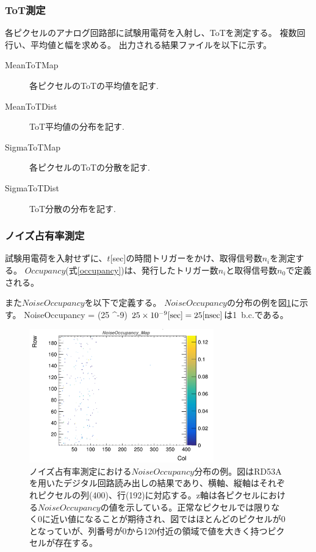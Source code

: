 \subsubsection{ToT測定}
各ピクセルのアナログ回路部に試験用電荷を入射し、ToTを測定する。
複数回行い、平均値と幅を求める。
出力される結果ファイルを以下に示す。
\begin{description}
  \item [MeanToTMap] 各ピクセルのToTの平均値を記す.
  \item [MeanToTDist] ToT平均値の分布を記す. 
  \item [SigmaToTMap] 各ピクセルのToTの分散を記す.
  \item [SigmaToTDist] ToT分散の分布を記す.
\end{description}

\subsubsection{ノイズ占有率測定}
試験用電荷を入射せずに、$t$[sec]の時間トリガーをかけ、取得信号数$n_i$を測定する。
$Occupancy$(式\ref{occupancy})は、発行したトリガー数$n_i$と取得信号数$n_0$で定義される。

また$NoiseOccupancy$を以下で定義する。
$NoiseOccupancy$の分布の例を図\ref{noise_occ}に示す。
\bbb
NoiseOccupancy =  \times (25 ^{-9})
\eee
$25 \times 10^{-9}[{\rm sec}]=25[{\rm nsec}]$は1~b.c.である。

\begin{figure}[bpt]\centering
\includegraphics[width=8cm]{noise_occ}
\caption[ノイズ占有率測定における$NoiseOccupancy$分布の例。]{ノイズ占有率測定における$NoiseOccupancy$分布の例。図はRD53Aを用いたデジタル回路読み出しの結果であり、横軸、縦軸はそれぞれピクセルの列(400)、行(192)に対応する。z軸は各ピクセルにおける$NoiseOccupancy$の値を示している。正常なピクセルでは限りなく0に近い値になることが期待され、図ではほとんどのピクセルが0となっていが、列番号が0から120付近の領域で値を大きく持つピクセルが存在する。}
\label{noise_occ}
\end{figure}

